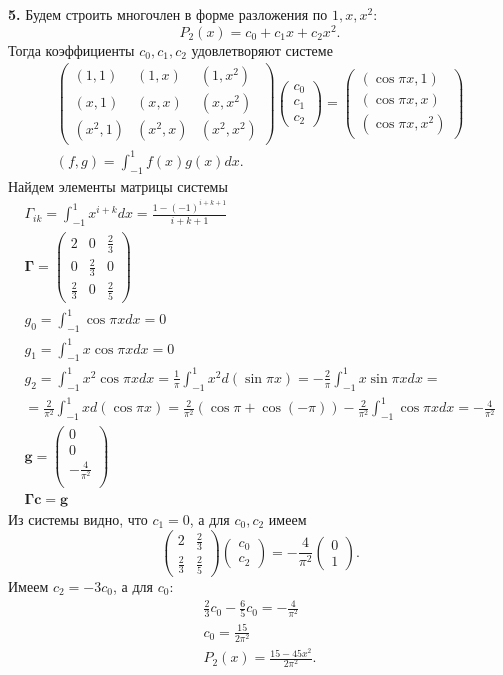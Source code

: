 \documentclass[12pt]{article}
\renewcommand{\vec}[1]{\boldsymbol{\mathbf{#1}}}
\begin{document}
\textbf{5.} Будем строить многочлен в форме разложения по $1, x, x^2$:
\[
P_2(x) = c_0 + c_1 x + c_2 x^2.
\]
Тогда коэффициенты $c_0, c_1, c_2$ удовлетворяют системе
\begin{gather*}
\begin{pmatrix}
(1, 1) & (1, x) & (1, x^2)\\
(x, 1) & (x, x) & (x, x^2)\\
(x^2, 1) & (x^2, x) & (x^2, x^2)
\end{pmatrix}
\begin{pmatrix}
c_0 \\ c_1 \\ c_2
\end{pmatrix}
= 
\begin{pmatrix}
(\cos \pi x, 1)\\
(\cos \pi x, x)\\
(\cos \pi x, x^2)
\end{pmatrix}\\
(f,g) = \int_{-1}^1 f(x) g(x) dx.
\end{gather*}
Найдем элементы матрицы системы
\begin{gather*}
\Gamma_{ik} = \int_{-1}^{1} x^{i+k}dx
= \frac{1 - (-1)^{i+k+1}}{i+k+1}\\
\vec \Gamma = \begin{pmatrix}
2 & 0 & \frac{2}{3}\\
0 & \frac{2}{3} & 0\\
\frac{2}{3} & 0 & \frac{2}{5}
\end{pmatrix}\\
g_0 = \int_{-1}^1 \cos \pi x dx = 0\\
g_1 = \int_{-1}^1 x \cos \pi x dx = 0\\
g_2 = \int_{-1}^1 x^2 \cos \pi x dx = 
\frac{1}{\pi}\int_{-1}^1 x^2 d(\sin \pi x) = 
-\frac{2}{\pi}\int_{-1}^1 x \sin \pi x dx = \\
= \frac{2}{\pi^2}\int_{-1}^1 x d(\cos \pi x) =
\frac{2}{\pi^2} (\cos \pi + \cos (-\pi)) - \frac{2}{\pi^2}
\int_{-1}^1 \cos \pi x dx = -\frac{4}{\pi^2}\\
\vec g = \begin{pmatrix}
0\\0\\-\frac{4}{\pi^2}\\
\end{pmatrix}\\
\vec \Gamma \vec c = \vec g
\end{gather*}
Из системы видно, что $c_1 = 0$, а для $c_0, c_2$ имеем
\[
\begin{pmatrix}
2 & \frac{2}{3}\\
\frac{2}{3} & \frac{2}{5}
\end{pmatrix}
\begin{pmatrix}
c_0 \\c_2
\end{pmatrix}
= -\frac{4}{\pi^2}
\begin{pmatrix}
0 \\ 1
\end{pmatrix}.
\]
Имеем $c_2 = -3c_0$, а для $c_0$:
\begin{gather*}
\frac{2}{3}c_0 - \frac{6}{5} c_0 = -\frac{4}{\pi^2}\\
c_0 = \frac{15}{2\pi^2}\\
P_2(x) = \frac{15 - 45 x^2}{2\pi^2}.
\end{gather*}
\end{document}
